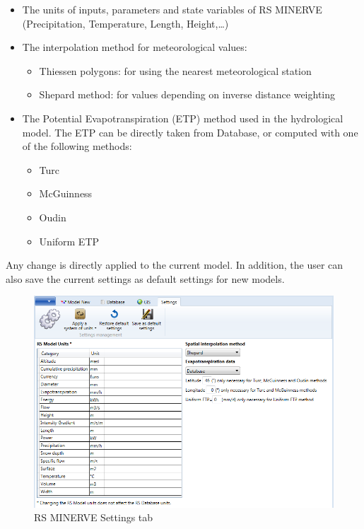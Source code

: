 \documentclass[
  letterpaper,
  DIV=11,
  numbers=noendperiod]{scrreprt}
\begin{document}
\begin{itemize}
\item
  The units of inputs, parameters and state variables of RS MINERVE
  (Precipitation, Temperature, Length, Height,\ldots)
\item
  The interpolation method for meteorological values:

  \begin{itemize}
  \item
    Thiessen polygons: for using the nearest meteorological station
  \item
    Shepard method: for values depending on inverse distance weighting
  \end{itemize}
\item
  The Potential Evapotranspiration (ETP) method used in the hydrological
  model. The ETP can be directly taken from Database, or computed with
  one of the following methods:

  \begin{itemize}
  \item
    Turc
  \item
    McGuinness
  \item
    Oudin
  \item
    Uniform ETP
  \end{itemize}
\end{itemize}

Any change is directly applied to the current model. In addition, the
user can also save the current settings as default settings for new
models.

\begin{figure}

{\centering \includegraphics{./figures/fig-settings_tab.png}

}

\caption{\label{fig-settings_tab}RS MINERVE Settings tab}

\end{figure}
\end{document}
